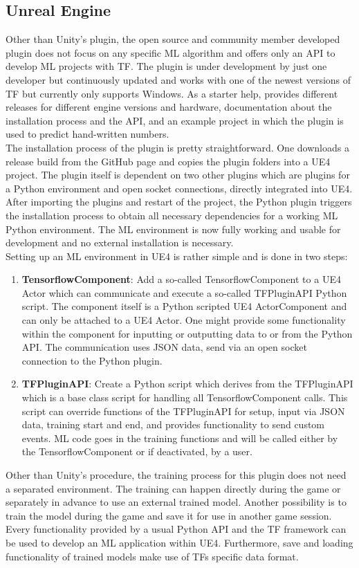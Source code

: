 \documentclass[MGS,Master,english]{twbook}%
\begin{document}
\subsection{Unreal Engine}
Other than Unity’s plugin, the open source and community member developed plugin does not focus on any specific ML algorithm and offers only an API to develop ML projects with \ac{TF}. The plugin is under development by just one developer but continuously updated and works with one of the newest versions of \ac{TF} but currently only supports Windows. As a starter help, \citep{ue4::tensorFlowPlugin} provides different releases for different engine versions and hardware, documentation about the installation process and the API, and an example project in which the plugin is used to predict hand-written numbers.\\
The installation process of the plugin is pretty straightforward. One downloads a release build from the GitHub page and copies the plugin folders into a \ac{UE4} project. The plugin itself is dependent on two other plugins which are plugins for a Python environment and open socket connections, directly integrated into UE4. After importing the plugins and restart of the project, the Python plugin triggers the installation process to obtain all necessary dependencies for a working ML Python environment. The ML environment is now fully working and usable for development and no external installation is necessary.\\
Setting up an ML environment in UE4 is rather simple and is done in two steps:
\begin{enumerate}
	\item \textbf{TensorflowComponent}: Add a so-called TensorflowComponent to a UE4 Actor which can communicate and execute a so-called TFPluginAPI Python script. The component itself is a Python scripted UE4 ActorComponent and can only be attached to a UE4 Actor. One might provide some functionality within the component for inputting or outputting data to or from the Python API. The communication uses JSON data, send via an open socket connection to the Python plugin.
	\item \textbf{TFPluginAPI}: Create a Python script which derives from the TFPluginAPI which is a base class script for handling all TensorflowComponent calls. This script can override functions of the TFPluginAPI for setup, input via JSON data, training start and end, and provides functionality to send custom events. ML code goes in the training functions and will be called either by the TensorflowComponent or if deactivated, by a user.
\end{enumerate}
Other than Unity’s procedure, the training process for this plugin does not need a separated environment. The training can happen directly during the game or separately in advance to use an external trained model. Another possibility is to train the model during the game and save it for use in another game session. Every functionality provided by a usual Python API and the \ac{TF} framework can be used to develop an ML application within UE4. Furthermore, save and loading functionality of trained models make use of \acp{TF} specific data format.
\end{document}
